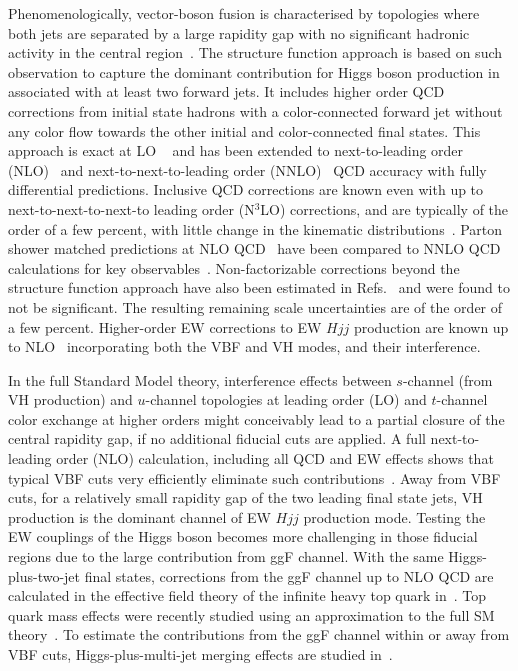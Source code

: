 \documentclass[10pt,prd,fleqn,superscriptaddress,notitlepage,nofootinbib,preprintnumbers,nobalancelastpage]{revtex4-1}
\newcommand{\VBF}{VBF\xspace}
\newcommand{\VH}{VH\xspace}
\begin{document}
Phenomenologically, vector-boson fusion is characterised by topologies where both jets are separated by a large rapidity gap with no significant hadronic activity in the central region~\cite{Rainwater:1997dg,Rainwater:1998kj,Rainwater:1999sd,Plehn:1999nw,Eboli:2000ze}.
The structure function approach is based on such observation to capture the dominant contribution for Higgs boson production in associated with at least two forward jets. 
It includes higher order QCD corrections from initial state hadrons with a color-connected forward jet without any color flow towards the other initial and color-connected final states.  
This approach is exact at LO ~\cite{Cahn:1983ip,Kane:1984bb} and has been extended to next-to-leading order (NLO)~\cite{Han:1992hr,Figy:2003nv,Bolzoni:2010xr} and next-to-next-to-leading order (NNLO)~\cite{Cacciari:2015jma,Cruz-Martinez:2018rod} QCD accuracy with fully differential predictions.
Inclusive QCD corrections are known even with up to next-to-next-to-next-to leading order (N$^3$LO) corrections, and are typically of the order of a few percent, with little change in the kinematic distributions~\cite{Dreyer:2016oyx}. 
Parton shower matched predictions at NLO QCD~\cite{Nason:2009ai,Platzer:2011bc,Frixione:2013mta} have been compared to NNLO QCD calculations for key observables~\cite{Jager:2020hkz}.
Non-factorizable corrections beyond the structure function approach have also been estimated in Refs.~\cite{Liu:2019tuy,Dreyer:2020urf} and were found to not be significant.
The resulting remaining scale uncertainties are of the order of a few percent. 
%
Higher-order EW corrections to EW $Hjj$ production are known up to NLO~\cite{Ciccolini:2007jr,Ciccolini:2007ec,Denner:2014cla} incorporating both the VBF and VH modes, and their interference. 

In the full Standard Model theory, interference effects between $s$-channel (from \VH production) and $u$-channel topologies at leading order (LO) and $t$-channel color exchange at higher orders might conceivably lead to a partial closure of the central rapidity gap, if no additional fiducial cuts are applied.
A full next-to-leading order (NLO) calculation, including all QCD and EW effects shows that typical \VBF cuts very efficiently eliminate such contributions~\cite{Ciccolini:2007jr,Ciccolini:2007ec}.
Away from \VBF cuts, for a relatively small rapidity gap of the two leading final state jets, \VH production is the dominant channel of EW $Hjj$ production mode.
Testing the EW couplings of the Higgs boson becomes more challenging in those fiducial regions due to the large contribution from ggF channel.
With the same Higgs-plus-two-jet final states,  corrections from the ggF channel up to NLO QCD are calculated in the effective field theory of the infinite heavy top quark in~\cite{Campbell:2006xx,vanDeurzen:2013rv}.
Top quark mass effects were recently studied using an approximation to the full SM theory~\cite{NNLOJETSecDec}.
To estimate the contributions from the ggF channel within or away from \VBF cuts,  Higgs-plus-multi-jet merging effects are studied in~\cite{Andersen:2018tnm}.
\end{document}
